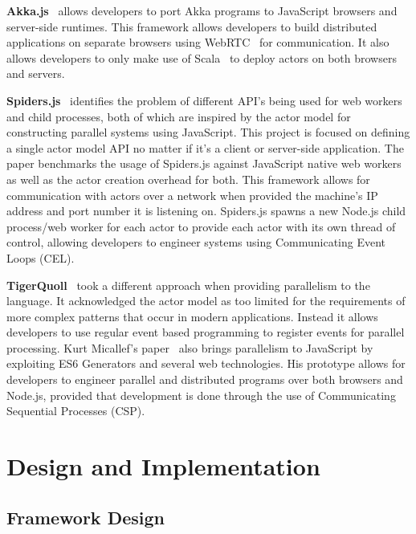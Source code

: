 \documentclass[oneside]{um-fict}
\begin{document}
\textbf{Akka.js}~\cite{stivan2015akka} allows developers to port Akka programs to JavaScript browsers and server-side runtimes. This framework allows developers to build distributed applications on separate browsers using WebRTC~\cite{webrtc} for communication. It also allows developers to only make use of Scala~\cite{scala} to deploy actors on both browsers and servers.

\textbf{Spiders.js}~\cite{spidersjs} identifies the problem of different API's being used for web workers and child processes, both of which are inspired by the actor model for constructing parallel systems using JavaScript. This project is focused on defining a single actor model API no matter if it's a client or server-side application. The paper benchmarks the usage of Spiders.js against JavaScript native web workers as well as the actor creation overhead for both. This framework allows for communication with actors over a network when provided the machine's IP address and port number it is listening on. Spiders.js spawns a new Node.js child process/web worker for each actor to provide each actor with its own thread of control, allowing developers to engineer systems using Communicating Event Loops (CEL).

\textbf{TigerQuoll}~\cite{tigerquoll} took a different approach when providing parallelism to the language. It acknowledged the actor model as too limited for the requirements of more complex patterns that occur in modern applications. Instead it allows developers to use regular event based programming to register events for parallel processing. Kurt Micallef's paper~\cite{kurt} also brings parallelism to JavaScript by exploiting ES6 Generators and several web technologies. His prototype allows for developers to engineer parallel and distributed programs over both browsers and Node.js, provided that development is done through the use of Communicating Sequential Processes (CSP).

\chapter{Design and Implementation}
\section{Framework Design}
\end{document}
